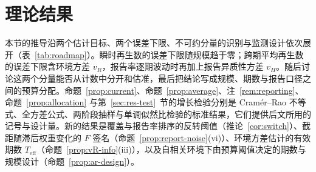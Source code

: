 \section{理论结果}
\label{sec:results}

本节的推导沿两个估计目标、两个误差下限、不可约分量的识别与监测设计依次展开（表~\ref{tab:roadmap}）。瞬时再生数的误差下限随规模趋于零；跨期平均再生数的误差下限含环境方差 $v_R$，报告率逐期波动时再加上报告异质性方差 $v_H$。随后讨论这两个分量能否从计数中分开和估准，最后把结论写成规模、期数与报告口径之间的预算分配。命题~\ref{prop:current}、命题~\ref{prop:average}、注~\ref{rem:reporting}、命题~\ref{prop:allocation} 与第~\ref{sec:res-test}~节的增长检验分别是 Cramér--Rao 不等式、全方差公式、两阶段抽样与单调似然比检验的标准结果，它们提供后文所用的记号与设计量。新的结果是覆盖与报告率排序的反转阈值（推论~\ref{cor:switch}）、截距随滞后权重变化的 $F$ 签名（命题~\ref{prop:report-noise}(vi)）、环境方差估计的有效期数 $T_{\mathrm{eff}}$（命题~\ref{prop:vR-info}(iii)），以及自相关环境下由预算阈值决定的期数与规模设计（命题~\ref{prop:ar-design}）。

